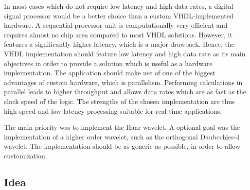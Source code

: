 \begin{refsection}
In most cases which do not require low latency and high data rates, a digital signal processor would be a better choice than a custom VHDL-implemented hardware.
A sequential processor unit is computationally very efficient and requires almost no chip area compared to most VHDL solutions.
However, it features a significantly higher latency, which is a major drawback.
Hence, the VHDL implementation should feature low latency and high data rate as its main objectives in order to provide a solution which is useful as a hardware implementation.
The application should make use of one of the biggest advantages of custom hardware, which is parallelism.
Performing calculations in parallel leads to higher throughput and allows data rates which are as fast as the clock speed of the logic.
The strengths of the chosen implementation are thus high speed and low latency processing suitable for real-time applications.

The main priority was to implement the Haar wavelet.
A optional goal was the implementation of a higher order wavelet, such as the orthogonal Daubechies-4 wavelet.
The implementation should be as generic as possible, in order to allow customization.

\subsection{Idea}


\end{refsection}
